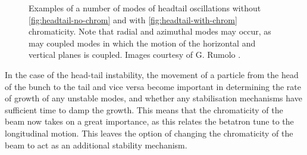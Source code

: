\begin{figure}
\begin{center}
\end{center}
\caption{Examples of a number of modes of headtail oscillations without \ref{fig:headtail-no-chrom} and with \ref{fig:headtail-with-chrom} chromaticity. Note that radial and azimuthal modes may occur, as may coupled modes in which the motion of the horizontal and vertical planes is coupled. Images courtesy of G. Rumolo \cite{Rumolo:IntroInstab}.}
\label{fig:trans_oscillations}
\end{figure}


In the case of the head-tail instability, the movement of a particle from the head of the bunch to the tail and vice versa become important in determining the rate of growth of any unstable modes, and whether any stabilisation mechanisms have sufficient time to damp the growth. This means that the chromaticity of the beam now takes on a great importance, as this relates the betatron tune to the longitudinal motion. This leaves the option of changing the chromaticity of the beam to act as an additional stability mechanism.


